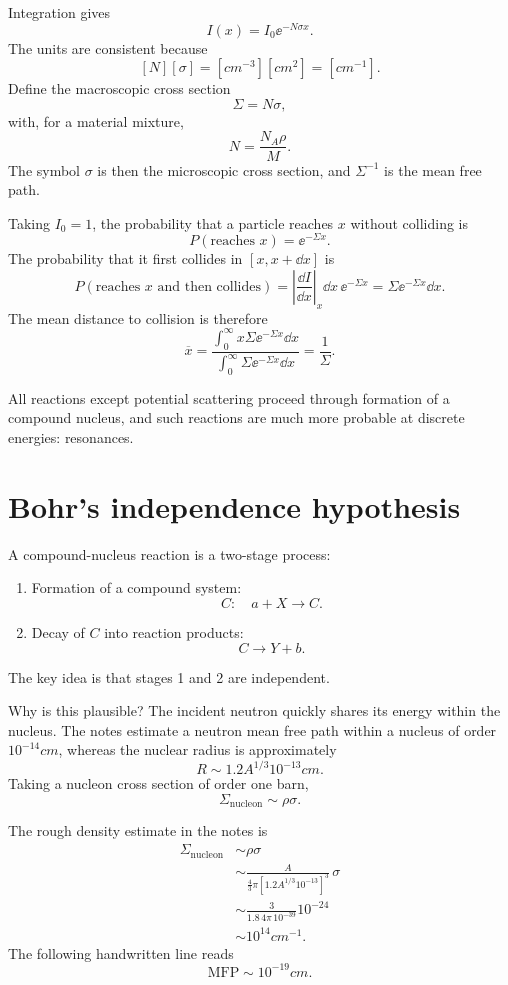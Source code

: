 Integration gives
\[
  I(x)=I_0\ee^{-N\sigma x}.
\]
The units are consistent because
\[
  [N][\sigma]=[\unit{cm^{-3}}][\unit{cm^2}]=[\unit{cm^{-1}}].
\]
Define the macroscopic cross section
\[
  \Sigma=N\sigma,
\]
with, for a material mixture,
\[
  N=\frac{N_A\rho}{M}.
\]
The symbol $\sigma$ is then the microscopic cross section, and $\Sigma^{-1}$ is the mean free path.

Taking $I_0=1$, the probability that a particle reaches $x$ without colliding is
\[
  P(\text{reaches }x)=\ee^{-\Sigma x}.
\]
The probability that it first collides in $[x,x+\dd x]$ is
\[
  P(\text{reaches }x\text{ and then collides})
  =\left|\frac{\dd I}{\dd x}\right|_{x}\dd x\,\ee^{-\Sigma x}
  =\Sigma\ee^{-\Sigma x}\dd x.
\]
The mean distance to collision is therefore
\[
  \overline{x}
  =\frac{\int_0^\infty x\Sigma\ee^{-\Sigma x}\dd x}
  {\int_0^\infty \Sigma\ee^{-\Sigma x}\dd x}
  =\frac{1}{\Sigma}.
\]

All reactions except potential scattering proceed through formation of a compound nucleus, and such reactions are much more probable at discrete energies: resonances.

\section{Bohr's independence hypothesis}
A compound-nucleus reaction is a two-stage process:
\begin{enumerate}
  \item Formation of a compound system:
  \[
    C:\quad a+X\longrightarrow C.
  \]
  \item Decay of $C$ into reaction products:
  \[
    C\longrightarrow Y+b.
  \]
\end{enumerate}
The key idea is that stages 1 and 2 are independent.

Why is this plausible?  The incident neutron quickly shares its energy within the nucleus.  The notes estimate a neutron mean free path within a nucleus of order $10^{-14}\unit{cm}$, whereas the nuclear radius is approximately
\[
  R\sim 1.2A^{1/3}10^{-13}\unit{cm}.
\]
Taking a nucleon cross section of order one barn,
\[
  \Sigma_{\text{nucleon}}\sim \rho\sigma.
\]

The rough density estimate in the notes is
\begin{align*}
  \Sigma_{\text{nucleon}}
  &\sim \rho\sigma\\
  &\sim \frac{A}{\frac{4}{3}\pi\left[1.2A^{1/3}10^{-13}\right]^3}\,\sigma\\
  &\sim \frac{3}{1.8\,4\pi\,10^{-39}}10^{-24}\\
  &\sim 10^{14}\unit{cm^{-1}}.
\end{align*}
The following handwritten line reads
\[
  \text{MFP}\sim 10^{-19}\unit{cm}.
\]

